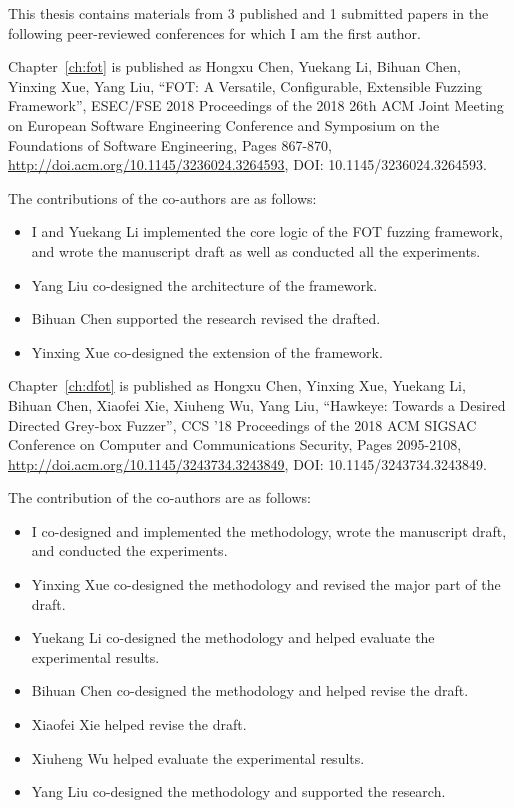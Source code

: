 \noindent This thesis contains materials from 3 published and 1 submitted papers in the following peer-reviewed conferences for which I am the first author.

\noindent Chapter~\ref{ch:fot} is published as Hongxu Chen, Yuekang Li, Bihuan Chen, Yinxing Xue, Yang Liu, ``FOT: A Versatile, Configurable, Extensible Fuzzing Framework'', ESEC/FSE 2018 Proceedings of the 2018 26th ACM Joint Meeting on European Software Engineering Conference and Symposium on the Foundations of Software Engineering, Pages 867-870, \url{http://doi.acm.org/10.1145/3236024.3264593}, DOI: 10.1145/3236024.3264593.

\noindent The contributions of the co-authors are as follows:
\begin{itemize}
  \item I and Yuekang Li implemented the core logic of the FOT fuzzing framework, and wrote the manuscript draft as well as conducted all the experiments.
  \item Yang Liu co-designed the architecture of the framework.
  \item Bihuan Chen supported the research revised the drafted.
  \item Yinxing Xue co-designed the \dFOT extension of the framework.
\end{itemize}

\noindent Chapter~\ref{ch:dfot} is published as Hongxu Chen, Yinxing Xue, Yuekang Li, Bihuan Chen, Xiaofei Xie, Xiuheng Wu, Yang Liu, ``Hawkeye: Towards a Desired Directed Grey-box Fuzzer'', CCS '18 Proceedings of the 2018 ACM SIGSAC Conference on Computer and Communications Security, Pages 2095-2108, \url{http://doi.acm.org/10.1145/3243734.3243849}, DOI: 10.1145/3243734.3243849.

\noindent The contribution of the co-authors are as follows:
\begin{itemize}
	\item I co-designed and implemented the methodology, wrote the manuscript draft, and conducted the experiments.
	\item Yinxing Xue co-designed the methodology and revised the major part of the draft.
	\item Yuekang Li co-designed the methodology and helped evaluate the experimental results.
	\item Bihuan Chen co-designed the methodology and helped revise the draft.
	\item Xiaofei Xie helped revise the draft.
	\item Xiuheng Wu helped evaluate the experimental results.
	\item Yang Liu co-designed the methodology and supported the research.
\end{itemize}

